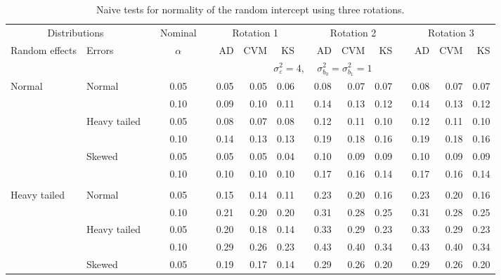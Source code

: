\documentclass[11pt]{article} %
\begin{document}
\begin{table}[ht]
\caption{Naive tests for normality of the random intercept using three rotations.}
\begin{scriptsize}
\begin{center}
\begin{tabular}{ll p{.1cm} c p{.1cm} rrr p{.1cm} rrr p{.1cm} rrr}
  \hline
  \multicolumn{2}{c}{Distributions}& & Nominal & &  \multicolumn{3}{c}{Rotation 1} & & \multicolumn{3}{c}{Rotation 2} & & \multicolumn{3}{c}{Rotation 3}\\ \cline{1-2} \cline{6-8} \cline{10-12} \cline{14-16}
  Random effects & Errors & & $\alpha$ & & AD & CVM & KS & & AD & CVM & KS & & AD & CVM & KS \\ 
   \hline
& && && \multicolumn{9}{c}{$\sigma_{\varepsilon}^2 = 4$, \ \ $\sigma_{b_0}^2 = \sigma_{b_1}^2 = 1$} \\ \cline{6-16}
Normal       & Normal       && 0.05 &&  0.05 & 0.05 & 0.06 && 0.08 & 0.07 & 0.07 && 0.08 & 0.07 & 0.07 \\ 
             &              && 0.10 &&  0.09 & 0.10 & 0.11 && 0.14 & 0.13 & 0.12 && 0.14 & 0.13 & 0.12 \\ 
             & Heavy tailed && 0.05 &&  0.08 & 0.07 & 0.08 && 0.12 & 0.11 & 0.10 && 0.12 & 0.11 & 0.10 \\ 
             &              && 0.10 &&  0.14 & 0.13 & 0.13 && 0.19 & 0.18 & 0.16 && 0.19 & 0.18 & 0.16 \\ 
             & Skewed       && 0.05 &&  0.05 & 0.05 & 0.04 && 0.10 & 0.09 & 0.09 && 0.10 & 0.09 & 0.09 \\ 
             &              && 0.10 &&  0.10 & 0.10 & 0.10 && 0.17 & 0.16 & 0.14 && 0.17 & 0.16 & 0.14 \\ 
             &&&&&&&&&&&&&&&\\
Heavy tailed & Normal       && 0.05 &&  0.15 & 0.14 & 0.11 && 0.23 & 0.20 & 0.16 && 0.23 & 0.20 & 0.16 \\ 
             &              && 0.10 &&  0.21 & 0.20 & 0.20 && 0.31 & 0.28 & 0.25 && 0.31 & 0.28 & 0.25 \\ 
             & Heavy tailed && 0.05 &&  0.20 & 0.18 & 0.14 && 0.33 & 0.29 & 0.23 && 0.33 & 0.29 & 0.23 \\ 
             &              && 0.10 &&  0.29 & 0.26 & 0.23 && 0.43 & 0.40 & 0.34 && 0.43 & 0.40 & 0.34 \\ 
             & Skewed       && 0.05 &&  0.19 & 0.17 & 0.14 && 0.29 & 0.26 & 0.20 && 0.29 & 0.26 & 0.20 \\ 

\end{tabular}
\end{center}
\end{scriptsize}
\end{table}
\end{document}
